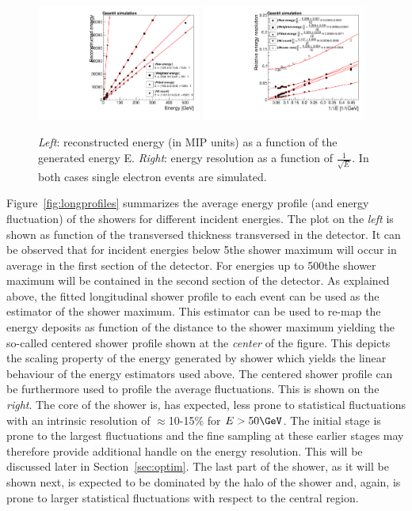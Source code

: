 \begin{figure}[h!]
  \begin{center}
   \includegraphics[width=0.48\textwidth]{figures/e_calibFit}
    \includegraphics[width=0.48\textwidth]{figures/e_resoFit}
    \caption{{\em Left}: reconstructed energy (in MIP units) as a function of the generated
      energy E. {\em Right}: energy resolution as a function of
      $\frac{1}{\sqrt{E}}$. In both cases single electron events are simulated.}
    \label{fig:baselinelinandresol}
  \end{center}
\end{figure}

Figure~\ref{fig:longprofiles} summarizes the average energy profile
(and energy fluctuation) of the showers for different incident
energies.
The plot on the {\em left} is shown as function of the transversed
thickness transversed in the detector.
It can be observed that for incident energies below 5\GeV the shower
maximum will occur in average in the first section of the detector.
For energies up to 500\GeV the shower maximum will be contained in the
second section of the detector.
As explained above, the fitted longitudinal shower profile to each
event can be used as the estimator of the shower maximum. This
estimator can be used to re-map the energy deposits as function of the
distance to the shower maximum yielding the so-called centered shower
profile shown at the {\em center} of the figure.
This depicts the scaling property of the energy generated by shower
which yields the linear behaviour of the energy estimators used above.
The centered shower profile can be furthermore used to profile the
average fluctuations. This is shown on the {\em right}.
The core of the shower is, has expected, less prone to statistical
fluctuations with an intrinsic resolution of $\approx$10-15\% for
$E>50\GeV$.
The initial stage is prone to the largest fluctuations and the fine
sampling at these earlier stages may therefore provide additional handle on the energy
resolution. This will be discussed later in Section~\ref{sec:optim}.
The last part of the shower, as it will be shown next, is expected to
be dominated by the halo of the shower and, again, is prone to larger
statistical fluctuations with respect to the central region.

